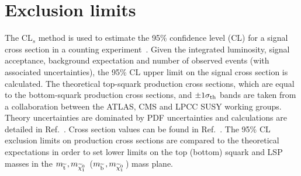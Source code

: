 \section{Exclusion limits}
\label{sec:STAT}

The CL$_{s}$ method is used to estimate the 95\% confidence level (CL) for a signal cross section in a counting experiment~\cite{bib:STAT_RooStats,PDG}.
Given the integrated luminosity, signal acceptance, background expectation and number of observed events (with associated uncertainties),
the 95\% CL upper limit on the signal cross section is calculated.
The theoretical top-squark production cross sections, which are equal to the bottom-squark production cross sections, and $\pm1\sigma_{\rm th}$ bands are taken from a collaboration between the \ac{ATLAS}, \ac{CMS}
and \ac{LPCC} \ac{SUSY} working groups. Theory uncertainties are dominated by PDF uncertainties 
and calculations are detailed in Ref.~\cite{bib:SUSYxs}. 
Cross section values can be found in Ref.~\cite{stopsbottomxs}.  
The 95\% CL exclusion limits on production cross sections are compared to the theoretical expectations in order to set lower limits on the top (bottom) squark and LSP masses in the $m_{\widetilde{{\rm t}}\,}, m_{\widetilde{\chi}^{0}_{1}\,}$ ($m_{\widetilde{{\rm b}}\,}, m_{\widetilde{\chi}^{0}_{1}\,}$) mass plane. 


